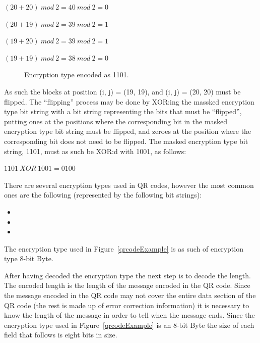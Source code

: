 \begin{center}

\((20+20)~mod~2=40~mod~2=0\)

\((20+19)~mod~2=39~mod~2=1\)

\((19+20)~mod~2=39~mod~2=1\)

\((19+19)~mod~2=38~mod~2=0\)

\end{center}

	\begin{figure}[H]%
		\centering
		\caption{Encryption type encoded as 1101.}
		\label{qrcodeExampleStep4}
	\end{figure}

As such the blocks at position (i, j) = (19, 19), and (i, j) = (20, 20) must be flipped. The ``flipping'' process may be done by XOR:ing the massked encryption type bit string with a bit string representing the bits that must be ``flipped'', putting ones at the positions where the corresponding bit in the masked encryption type bit string must be flipped, and zeroes at the position where the corresponding bit does not need to be flipped. The masked encryption type bit string, 1101, must as such be XOR:d with 1001, as follows:

\begin{center}
\(1101~XOR~1001=0100\)
\end{center}

There are several encryption types used in QR codes, however the most common ones are the following (represented by the following bit strings):

\begin{itemize}
	\item {}		
	\item {} 	
	\item {}		
\end{itemize}

The encryption type used in Figure~\ref{qrcodeExample} is as such of encryption type 8-bit Byte.

After having decoded the encryption type the next step is to decode the length. The encoded length is the length of the message encoded in the QR code. Since the message encoded in the QR code may not cover the entire data section of the QR code (the rest is made up of error correction information) it is necessary to know the length of the message in order to tell when the message ends. Since the encryption type used in Figure~\ref{qrcodeExample} is an 8-bit Byte the size of each field that follows is eight bits in size.

